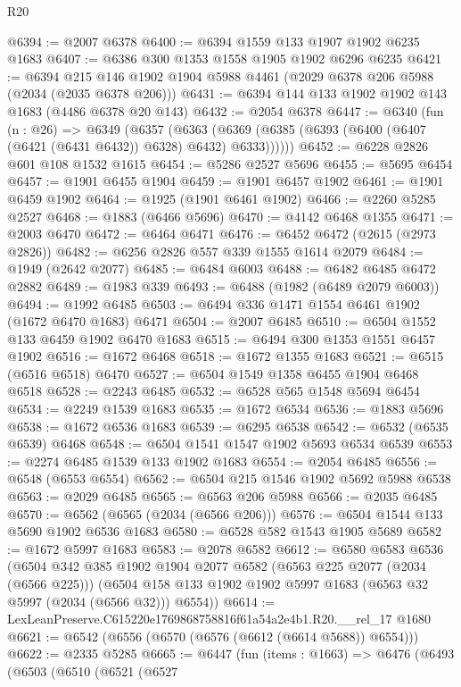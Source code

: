 \begin{lexlean}{R20}
\begin{coremodule}
@6394 := @2007 @6378
@6400 := @6394 @1559 @133 @1907 @1902 @6235 @1683
@6407 := @6386 @300 @1353 @1558 @1905 @1902 @6296 @6235
@6421 := @6394 @215 @146 @1902 @1904 @5988 @4461 (@2029 @6378 @206 @5988 (@2034 (@2035 @6378 @206)))
@6431 := @6394 @144 @133 @1902 @1902 @143 @1683 (@4486 @6378 @20 @143)
@6432 := @2054 @6378
@6447 := @6340
    (fun (n : @26) =>
    @6349
      (@6357
        (@6363 (@6369 (@6385 (@6393 (@6400 (@6407 (@6421 (@6431 @6432)) @6328) @6432) @6333))))))
@6452 := @6228 @2826 @601 @108 @1532 @1615
@6454 := @5286 @2527 @5696
@6455 := @5695 @6454
@6457 := @1901 @6455 @1904
@6459 := @1901 @6457 @1902
@6461 := @1901 @6459 @1902
@6464 := @1925 (@1901 @6461 @1902)
@6466 := @2260 @5285 @2527
@6468 := @1883 (@6466 @5696)
@6470 := @4142 @6468 @1355
@6471 := @2003 @6470
@6472 := @6464 @6471
@6476 := @6452 @6472 (@2615 (@2973 @2826))
@6482 := @6256 @2826 @557 @339 @1555 @1614 @2079
@6484 := @1949 (@2642 @2077)
@6485 := @6484 @6003
@6488 := @6482 @6485 @6472 @2882
@6489 := @1983 @339
@6493 := @6488 (@1982 (@6489 @2079 @6003))
@6494 := @1992 @6485
@6503 := @6494 @336 @1471 @1554 @6461 @1902 (@1672 @6470 @1683) @6471
@6504 := @2007 @6485
@6510 := @6504 @1552 @133 @6459 @1902 @6470 @1683
@6515 := @6494 @300 @1353 @1551 @6457 @1902
@6516 := @1672 @6468
@6518 := @1672 @1355 @1683
@6521 := @6515 (@6516 @6518) @6470
@6527 := @6504 @1549 @1358 @6455 @1904 @6468 @6518
@6528 := @2243 @6485
@6532 := @6528 @565 @1548 @5694 @6454
@6534 := @2249 @1539 @1683
@6535 := @1672 @6534
@6536 := @1883 @5696
@6538 := @1672 @6536 @1683
@6539 := @6295 @6538
@6542 := @6532 (@6535 @6539) @6468
@6548 := @6504 @1541 @1547 @1902 @5693 @6534 @6539
@6553 := @2274 @6485 @1539 @133 @1902 @1683
@6554 := @2054 @6485
@6556 := @6548 (@6553 @6554)
@6562 := @6504 @215 @1546 @1902 @5692 @5988 @6538
@6563 := @2029 @6485
@6565 := @6563 @206 @5988
@6566 := @2035 @6485
@6570 := @6562 (@6565 (@2034 (@6566 @206)))
@6576 := @6504 @1544 @133 @5690 @1902 @6536 @1683
@6580 := @6528 @582 @1543 @1905 @5689
@6582 := @1672 @5997 @1683
@6583 := @2078 @6582
@6612 := @6580
    @6583
    @6536
    (@6504
      @342
      @385
      @1902
      @1904
      @2077
      @6582
      (@6563 @225 @2077 (@2034 (@6566 @225)))
      (@6504 @158 @133 @1902 @1902 @5997 @1683 (@6563 @32 @5997 (@2034 (@6566 @32))) @6554))
@6614 := LexLeanPreserve.C615220e1769868758816f61a54a2e4b1.R20.__rel_17 @1680
@6621 := @6542 (@6556 (@6570 (@6576 (@6612 (@6614 @5688)) @6554)))
@6622 := @2335 @5285
@6665 := @6447
    (fun (items : @1663) =>
    @6476
      (@6493
        (@6503
          (@6510
            (@6521
              (@6527

\end{coremodule}
\end{lexlean}
